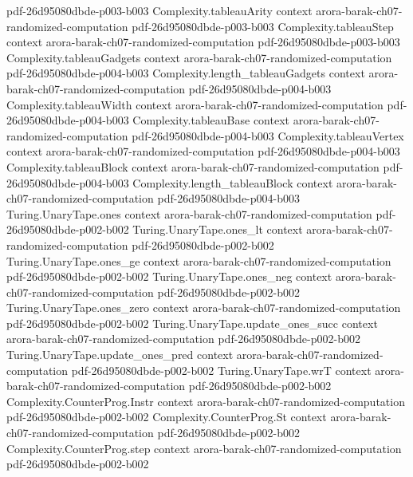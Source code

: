 \begin{theorem}
  {pdf-26d95080dbde-p003-b003}
\proofstep
  {Complexity.tableauArity}
  {context}
  {arora-barak-ch07-randomized-computation}
  {pdf-26d95080dbde-p003-b003}
\proofstep
  {Complexity.tableauStep}
  {context}
  {arora-barak-ch07-randomized-computation}
  {pdf-26d95080dbde-p003-b003}
\proofstep
  {Complexity.tableauGadgets}
  {context}
  {arora-barak-ch07-randomized-computation}
  {pdf-26d95080dbde-p004-b003}
\proofstep
  {Complexity.length_tableauGadgets}
  {context}
  {arora-barak-ch07-randomized-computation}
  {pdf-26d95080dbde-p004-b003}
\proofstep
  {Complexity.tableauWidth}
  {context}
  {arora-barak-ch07-randomized-computation}
  {pdf-26d95080dbde-p004-b003}
\proofstep
  {Complexity.tableauBase}
  {context}
  {arora-barak-ch07-randomized-computation}
  {pdf-26d95080dbde-p004-b003}
\proofstep
  {Complexity.tableauVertex}
  {context}
  {arora-barak-ch07-randomized-computation}
  {pdf-26d95080dbde-p004-b003}
\proofstep
  {Complexity.tableauBlock}
  {context}
  {arora-barak-ch07-randomized-computation}
  {pdf-26d95080dbde-p004-b003}
\proofstep
  {Complexity.length_tableauBlock}
  {context}
  {arora-barak-ch07-randomized-computation}
  {pdf-26d95080dbde-p004-b003}
\proofstep
  {Turing.UnaryTape.ones}
  {context}
  {arora-barak-ch07-randomized-computation}
  {pdf-26d95080dbde-p002-b002}
\proofstep
  {Turing.UnaryTape.ones_lt}
  {context}
  {arora-barak-ch07-randomized-computation}
  {pdf-26d95080dbde-p002-b002}
\proofstep
  {Turing.UnaryTape.ones_ge}
  {context}
  {arora-barak-ch07-randomized-computation}
  {pdf-26d95080dbde-p002-b002}
\proofstep
  {Turing.UnaryTape.ones_neg}
  {context}
  {arora-barak-ch07-randomized-computation}
  {pdf-26d95080dbde-p002-b002}
\proofstep
  {Turing.UnaryTape.ones_zero}
  {context}
  {arora-barak-ch07-randomized-computation}
  {pdf-26d95080dbde-p002-b002}
\proofstep
  {Turing.UnaryTape.update_ones_succ}
  {context}
  {arora-barak-ch07-randomized-computation}
  {pdf-26d95080dbde-p002-b002}
\proofstep
  {Turing.UnaryTape.update_ones_pred}
  {context}
  {arora-barak-ch07-randomized-computation}
  {pdf-26d95080dbde-p002-b002}
\proofstep
  {Turing.UnaryTape.wrT}
  {context}
  {arora-barak-ch07-randomized-computation}
  {pdf-26d95080dbde-p002-b002}
\proofstep
  {Complexity.CounterProg.Instr}
  {context}
  {arora-barak-ch07-randomized-computation}
  {pdf-26d95080dbde-p002-b002}
\proofstep
  {Complexity.CounterProg.St}
  {context}
  {arora-barak-ch07-randomized-computation}
  {pdf-26d95080dbde-p002-b002}
\proofstep
  {Complexity.CounterProg.step}
  {context}
  {arora-barak-ch07-randomized-computation}
  {pdf-26d95080dbde-p002-b002}

\end{theorem}
